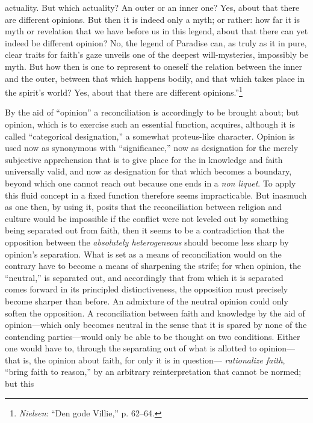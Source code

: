 \documentclass[12pt,a4paper]{book}
\begin{document}
actuality. But which actuality? An outer or an inner one? Yes, about that there are different opinions. But then it is
indeed only a myth; or rather: how far it is myth or revelation that we have before us in this legend, about that there
can yet indeed be different opinion? No, the legend of Paradise can, as truly as it in pure, clear traits for faith's
gaze unveils one of the deepest will-mysteries, impossibly be myth. But how then is one to represent to oneself the
relation between the inner and the outer, between that which happens bodily, and that which takes place in the spirit's
world? Yes, about that there are different opinions.''\footnote{\emph{Nielsen}: ``Den gode Villie,'' p. 62--64.}

By the aid of ``opinion'' a reconciliation is accordingly to be brought about; but opinion, which is to exercise such an
essential function, acquires, although it is called ``categorical designation,'' a somewhat proteus-like character.
Opinion is used now as synonymous with ``significance,'' now as designation for the merely subjective apprehension that
is to give place for the in knowledge and faith universally valid, and now as designation for that which becomes a
boundary, beyond which one cannot reach out because one ends in a \textit{non liquet}. To apply this fluid concept in a
fixed function therefore seems impracticable. But inasmuch as one then, by using it, posits that the reconciliation
between religion and culture would be impossible if the conflict were not leveled out by something being separated out
from faith, then it seems to be a contradiction that the opposition between the \emph{absolutely heterogeneous} should
become less sharp by opinion's separation. What is set as a means of reconciliation would on the contrary have to become
a means of sharpening the strife; for when opinion, the ``neutral,'' is separated out, and accordingly that from which it
is separated comes forward in its principled distinctiveness, the opposition must precisely become sharper than before. An
admixture of the neutral opinion could only soften the opposition.
A reconciliation between faith and knowledge by the aid of opinion---which only becomes neutral in the sense that it is
spared by none of the contending parties---would only be able to be thought on two conditions. Either one would have to,
through the separating out of what is allotted to opinion---that is, the opinion about faith, for only it is in question---
\emph{rationalize faith}, ``bring faith to reason,'' by an arbitrary reinterpretation that cannot be normed; but this
\end{document}
